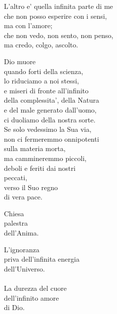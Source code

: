 \begin{haiku}
	L'altro e' quella infinita parte di me\\
	che non posso esperire con i sensi,\\
	ma con l'amore;\\
	che non vedo, non sento, non penso,\\
	ma credo, colgo, ascolto.\\
\end{haiku}

\begin{haiku}
    Dio muore\\
    quando forti della scienza,\\
    lo riduciamo a noi stessi,\\
    e miseri di fronte all'infinito\\
    della complessita', della Natura\\
    e del male generato dall'uomo,\\
    ci duoliamo della nostra sorte.\\
    Se solo vedessimo la Sua via,\\
    non ci fermeremmo onnipotenti\\
    sulla materia morta,\\
    ma cammineremmo piccoli,\\
    deboli e feriti dai nostri\\
    peccati,\\
    verso il Suo regno\\
    di vera pace.\\
\end{haiku}

\begin{haiku}
    Chiesa\\
    palestra\\
    dell'Anima.\\
\end{haiku}

\begin{haiku}
    L'ignoranza\\
    priva dell'infinita energia\\
    dell'Universo.\\
    \leavevmode\\
    La durezza del cuore\\
    dell'infinito amore\\
    di Dio.\\
\end{haiku}

